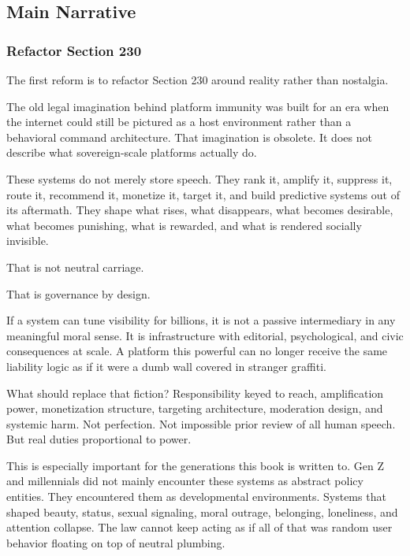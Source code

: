 \documentclass[
  american,
  12pt,
  letterpaper,
]{article}
\begin{document}
\subsection{Main Narrative}\label{main-narrative}

\subsubsection{Refactor Section 230}\label{refactor-section-230}

The first reform is to refactor Section 230 around reality rather than
nostalgia.

The old legal imagination behind platform immunity was built for an era
when the internet could still be pictured as a host environment rather
than a behavioral command architecture. That imagination is obsolete. It
does not describe what sovereign-scale platforms actually do.

These systems do not merely store speech. They rank it, amplify it,
suppress it, route it, recommend it, monetize it, target it, and build
predictive systems out of its aftermath. They shape what rises, what
disappears, what becomes desirable, what becomes punishing, what is
rewarded, and what is rendered socially invisible.

That is not neutral carriage.

That is governance by design.

If a system can tune visibility for billions, it is not a passive
intermediary in any meaningful moral sense. It is infrastructure with
editorial, psychological, and civic consequences at scale. A platform
this powerful can no longer receive the same liability logic as if it
were a dumb wall covered in stranger graffiti.

What should replace that fiction? Responsibility keyed to reach,
amplification power, monetization structure, targeting architecture,
moderation design, and systemic harm. Not perfection. Not impossible
prior review of all human speech. But real duties proportional to power.

This is especially important for the generations this book is written
to. Gen Z and millennials did not mainly encounter these systems as
abstract policy entities. They encountered them as developmental
environments. Systems that shaped beauty, status, sexual signaling,
moral outrage, belonging, loneliness, and attention collapse. The law
cannot keep acting as if all of that was random user behavior floating
on top of neutral plumbing.
\end{document}
